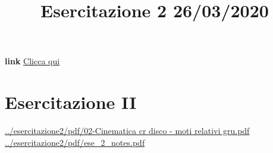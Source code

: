 \title{Esercitazione 2 26/03/2020}\newline
\textbf{link} \href{https://web.microsoftstream.com/video/c4d111d7-4825-4513-afe0-f0fd323398dd}{Clicca qui}
\section{Esercitazione II}
\url{../esercitazione2/pdf/02-Cinematica cr disco - moti relativi gru.pdf}\newline
\url{../esercitazione2/pdf/ese_2_notes.pdf}\newline
